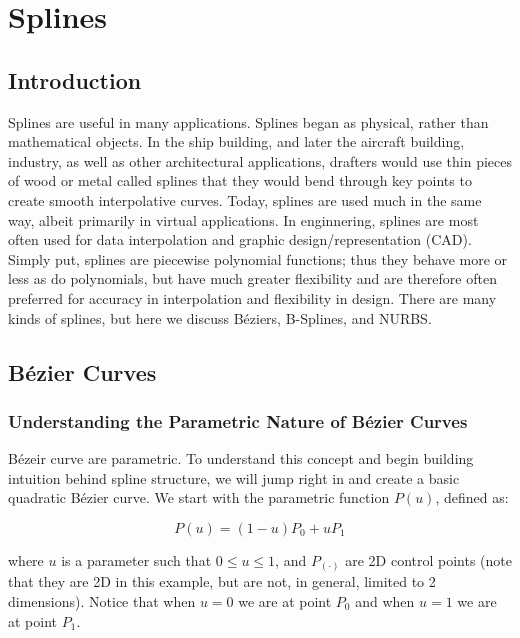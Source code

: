 


	
\chapter{Splines}
\label{ch:splines}


\section{Introduction}
\label{sec:splinesintro}

Splines are useful in many applications. Splines began as physical, rather than mathematical objects. In the ship building, and later the aircraft building, industry, as well as other architectural applications, drafters would use thin pieces of wood or metal called splines that they would bend through key points to create smooth interpolative curves.  Today, splines are used much in the same way, albeit primarily in virtual applications.  In enginnering, splines are most often used for data interpolation and graphic design/representation (CAD). Simply put, splines are piecewise polynomial functions; thus they behave more or less as do polynomials, but have much greater flexibility and are therefore often preferred for accuracy in interpolation and flexibility in design. There are many kinds of splines, but here we discuss Béziers, B-Splines, and NURBS.

\section{Bézier Curves}
\subsection{Understanding the Parametric Nature of Bézier Curves}
Bézeir curve are parametric.  To understand this concept and begin building intuition behind spline structure, we will jump right in and create a basic quadratic Bézier curve. We start with the parametric function $P(u)$, defined as:

\begin{equation}
\label{eq:parametricrelation}
P(u) = (1-u)P_0 + uP_1
\end{equation}

where $u$ is a parameter such that $0 \leq u \leq 1$, and $P_{(\cdot)}$ are 2D control points (note that they are 2D in this example, but are not, in general, limited to 2 dimensions). Notice that when $u=0$ we are at point $P_0$ and when $u=1$ we are at point $P_1$. 

